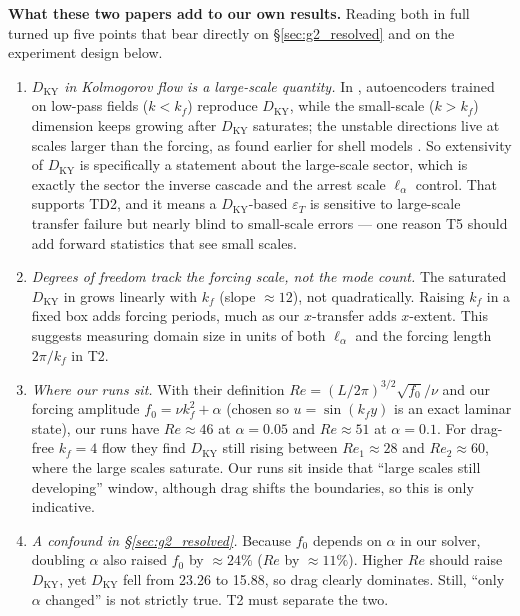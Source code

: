 \documentclass[11pt]{article}
\begin{document}
\textbf{What these two papers add to our own results.} Reading both in
full turned up five points that bear directly on \S\ref{sec:g2_resolved}
and on the experiment design below.
\begin{enumerate}[nosep]
\item \emph{$D_{\mathrm{KY}}$ in Kolmogorov flow is a large-scale
  quantity.} In \cite{kolmogorovregimes2026}, autoencoders trained on
  low-pass fields ($k<k_f$) reproduce $D_{\mathrm{KY}}$, while the
  small-scale ($k>k_f$) dimension keeps growing after $D_{\mathrm{KY}}$
  saturates; the unstable directions live at scales larger than the
  forcing, as found earlier for shell models \cite{yamadaohkitani1988}.
  So extensivity of $D_{\mathrm{KY}}$ is specifically a statement about
  the large-scale sector, which is exactly the sector the inverse cascade
  and the arrest scale $\ell_\alpha$ control. That supports TD2, and it
  means a $D_{\mathrm{KY}}$-based $\varepsilon_T$ is sensitive to
  large-scale transfer failure but nearly blind to small-scale errors ---
  one reason T5 should add forward statistics that see small scales.
\item \emph{Degrees of freedom track the forcing scale, not the mode
  count.} The saturated $D_{\mathrm{KY}}$ in \cite{kolmogorovregimes2026}
  grows linearly with $k_f$ (slope $\approx12$), not quadratically.
  Raising $k_f$ in a fixed box adds forcing periods, much as our
  $x$-transfer adds $x$-extent. This suggests measuring domain size in
  units of both $\ell_\alpha$ and the forcing length $2\pi/k_f$ in T2.
\item \emph{Where our runs sit.} With their definition
  $Re=(L/2\pi)^{3/2}\sqrt{f_0}/\nu$ and our forcing amplitude
  $f_0=\nu k_f^2+\alpha$ (chosen so $u=\sin(k_f y)$ is an exact
  laminar state), our runs have $Re\approx46$ at $\alpha{=}0.05$ and
  $Re\approx51$ at $\alpha{=}0.1$. For drag-free $k_f{=}4$ flow they find
  $D_{\mathrm{KY}}$ still rising between $Re_1\approx28$ and
  $Re_2\approx60$, where the large scales saturate. Our runs sit inside
  that ``large scales still developing'' window, although drag shifts the
  boundaries, so this is only indicative.
\item \emph{A confound in \S\ref{sec:g2_resolved}.} Because $f_0$ depends
  on $\alpha$ in our solver, doubling $\alpha$ also raised $f_0$ by
  $\approx24\%$ ($Re$ by $\approx11\%$). Higher $Re$ should raise
  $D_{\mathrm{KY}}$, yet $D_{\mathrm{KY}}$ fell from 23.26 to 15.88, so
  drag clearly dominates. Still, ``only $\alpha$ changed'' is not
  strictly true. T2 must separate the two.

\end{enumerate}
\end{document}
